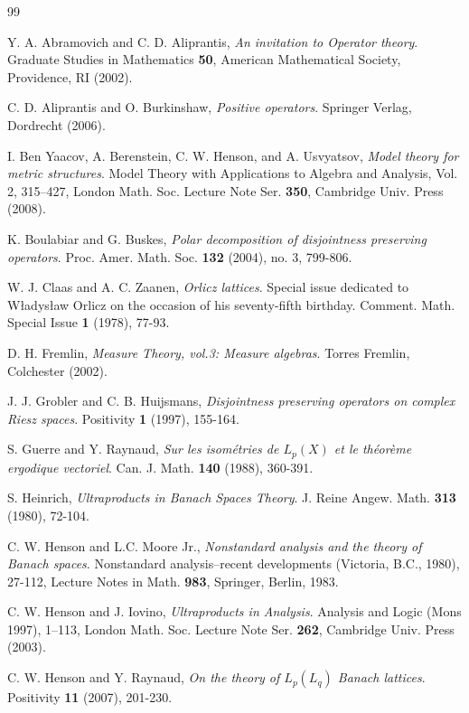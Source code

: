 \documentclass[11pt]{amsart}
\theoremstyle{plain}
\theoremstyle{remark}
\begin{document}
\begin{thebibliography}{99}

 Y. A. Abramovich and C. D. Aliprantis, {\it An invitation to Operator theory}. Graduate Studies in Mathematics  {\bf 50}, American Mathematical Society, Providence, RI (2002). 

 C. D. Aliprantis and O. Burkinshaw, {\it Positive operators}. Springer Verlag, Dordrecht (2006).

 I. Ben Yaacov, A. Berenstein, C. W. Henson, and A. Usvyatsov, {\it Model theory for metric structures}. Model Theory with Applications to Algebra and Analysis, Vol. 2,  315--427, London Math. Soc. Lecture Note Ser. {\bf 350}, Cambridge Univ. Press (2008).

 K. Boulabiar and G. Buskes, {\it Polar decomposition of disjointness preserving operators}. Proc. Amer. Math. Soc. {\bf 132} (2004), no. 3, 799-806.

 W. J. Claas and  A. C. Zaanen, {\it Orlicz lattices}. 
Special issue dedicated to W\l adys\l aw Orlicz on the occasion of his seventy-fifth birthday. 
Comment. Math. Special Issue {\bf 1} (1978), 77-93. 

 D. H. Fremlin, {\it Measure Theory, vol.3: Measure algebras}. Torres Fremlin, Colchester (2002).

  J. J. Grobler and C. B. Huijsmans, {\it Disjointness preserving operators on complex Riesz spaces}. Positivity {\bf 1} (1997), 155-164.

  S. Guerre and Y. Raynaud, {\it Sur les isom\'etries de $L_p(X)$ et le th\'eor\`eme ergodique vectoriel}.  Can. J. Math. {\bf 140} (1988),  360-391.

  S. Heinrich, {\it Ultraproducts in Banach Spaces Theory}.  J. Reine
Angew. Math. {\bf 313} (1980), 72-104.

 C. W. Henson and L.C. Moore Jr., {\it Nonstandard analysis and the theory of Banach spaces}. Nonstandard analysis--recent developments (Victoria, B.C., 1980), 27-112,  Lecture Notes in Math. {\bf 983}, Springer, Berlin, 1983.

 C. W. Henson and J. Iovino, {\it Ultraproducts in Analysis}. Analysis
and Logic (Mons 1997), 1--113, London Math. Soc. Lecture Note Ser. {\bf 262}, Cambridge Univ. Press (2003).

 C. W. Henson and Y. Raynaud, {\it On the theory of $L_p(L_q)$ Banach lattices}.  Positivity {\bf 11} (2007), 201-230.


\end{thebibliography}
\end{document}
